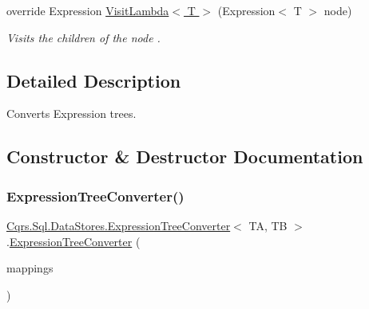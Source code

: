 \begin{DoxyCompactItemize}
override Expression \hyperlink{classCqrs_1_1Sql_1_1DataStores_1_1ExpressionTreeConverter_abf97079f29447cd8e0bcfab91891ccb9_abf97079f29447cd8e0bcfab91891ccb9}{Visit\+Lambda$<$ T $>$} (Expression$<$ T $>$ node)
\begin{DoxyCompactList}\small\item\em Visits the children of the {\itshape node} . \end{DoxyCompactList}\end{DoxyCompactItemize}


\subsection{Detailed Description}
Converts Expression trees. 



\subsection{Constructor \& Destructor Documentation}
\mbox{\label{classCqrs_1_1Sql_1_1DataStores_1_1ExpressionTreeConverter_a6c0d0c72deab71e40aa9e1526fd82593_a6c0d0c72deab71e40aa9e1526fd82593}} 
\subsubsection{\texorpdfstring{Expression\+Tree\+Converter()}{ExpressionTreeConverter()}\hspace{0.1cm}{\footnotesize\ttfamily [1/2]}}
{\footnotesize\ttfamily \hyperlink{classCqrs_1_1Sql_1_1DataStores_1_1ExpressionTreeConverter}{Cqrs.\+Sql.\+Data\+Stores.\+Expression\+Tree\+Converter}$<$ TA, TB $>$.\hyperlink{classCqrs_1_1Sql_1_1DataStores_1_1ExpressionTreeConverter}{Expression\+Tree\+Converter} (\begin{DoxyParamCaption}\item[{Dictionary$<$ Member\+Info, Lambda\+Expression $>$}]{mappings }\end{DoxyParamCaption})\hspace{0.3cm}{\ttfamily [protected]}}



